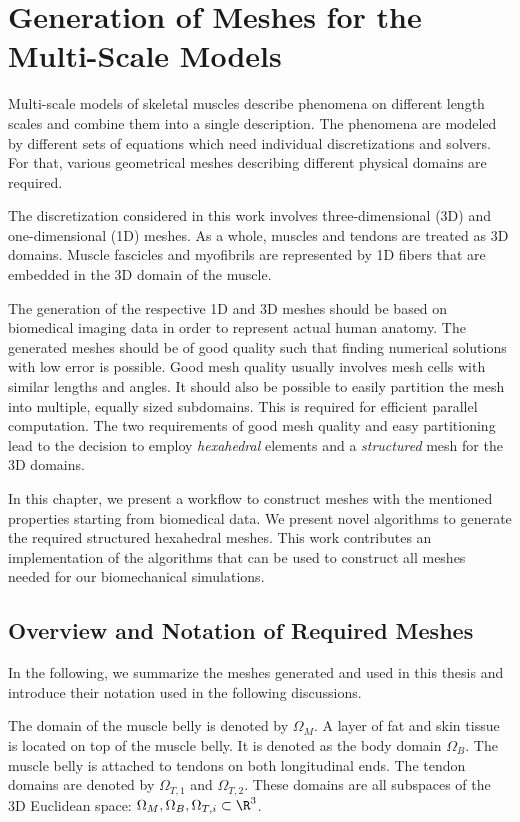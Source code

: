 
\chapter{Generation of Meshes for the Multi-Scale Models}\label{sec:generation_of_meshes_for_multiscale}
Multi-scale models of skeletal muscles describe phenomena on different length scales and combine them into a single description. The phenomena are modeled by different sets of equations which need individual discretizations and solvers. For that, various geometrical meshes describing different physical domains are required.

The discretization considered in this work involves three-dimensional (3D) and one-dimensional (1D) meshes.
As a whole, muscles and tendons are treated as 3D domains. Muscle fascicles and myofibrils are represented by 1D fibers that are embedded in the 3D domain of the muscle.

The generation of the respective 1D and 3D meshes should be based on biomedical imaging data in order to represent actual human anatomy. The generated meshes should be of good quality such that finding numerical solutions with low error is possible. Good mesh quality usually involves mesh cells with similar lengths and angles. It should also be possible to easily partition the mesh into multiple, equally sized subdomains. This is required for efficient parallel computation.
The two requirements of good mesh quality and easy partitioning lead to the decision to employ \emph{hexahedral} elements and a \emph{structured} mesh for the 3D domains.

In this chapter, we present a workflow to construct meshes with the mentioned properties starting from biomedical data. We present novel algorithms to generate the required structured hexahedral meshes. This work contributes an implementation of the algorithms that can be used to construct all meshes needed for our biomechanical simulations.

\section{Overview and Notation of Required Meshes}\label{sec:overview_and_notation_of_required_meshes}
In the following, we summarize the meshes generated and used in this thesis and introduce their notation used in the following discussions.

The domain of the muscle belly is denoted by $\Omega_M$. A layer of fat and skin tissue is located on top of the muscle belly. It is denoted as the body domain $\Omega_B$.
The muscle belly is attached to tendons on both longitudinal ends. The tendon domains are denoted by $\Omega_{T,1}$ and $\Omega_{T,2}$. These domains are all subspaces of the 3D Euclidean space: $\Omega_M,\Omega_B,\Omega_{T,i} \subset \R^3$.

